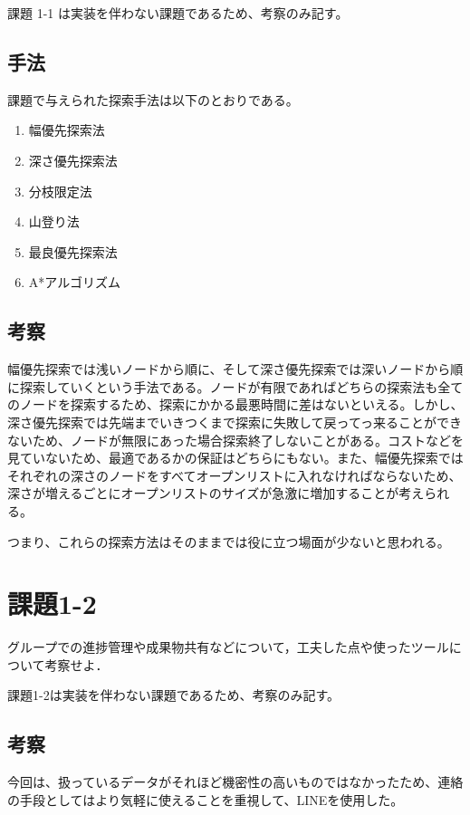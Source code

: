 ﻿\documentclass{jarticle}
\begin{document}
課題 1-1 は実装を伴わない課題であるため、考察のみ記す。

\subsection{手法}
課題で与えられた探索手法は以下のとおりである。

\begin{enumerate}
\item 幅優先探索法
\item 深さ優先探索法
\item 分枝限定法
\item 山登り法
\item 最良優先探索法
\item A*アルゴリズム
\end{enumerate}


\subsection{考察}
幅優先探索では浅いノードから順に、そして深さ優先探索では深いノードから順に探索していくという手法である。ノードが有限であればどちらの探索法も全てのノードを探索するため、探索にかかる最悪時間に差はないといえる。しかし、深さ優先探索では先端までいきつくまで探索に失敗して戻ってっ来ることができないため、ノードが無限にあった場合探索終了しないことがある。コストなどを見ていないため、最適であるかの保証はどちらにもない。また、幅優先探索ではそれぞれの深さのノードをすべてオープンリストに入れなければならないため、深さが増えるごとにオープンリストのサイズが急激に増加することが考えられる。

つまり、これらの探索方法はそのままでは役に立つ場面が少ないと思われる。


\section{課題1-2}
\begin{screen}
  グループでの進捗管理や成果物共有などについて，工夫した点や使ったツールについて考察せよ．
\end{screen}

課題1-2は実装を伴わない課題であるため、考察のみ記す。

\subsection{考察}
今回は、扱っているデータがそれほど機密性の高いものではなかったため、連絡の手段としてはより気軽に使えることを重視して、LINEを使用した。
\end{document}
